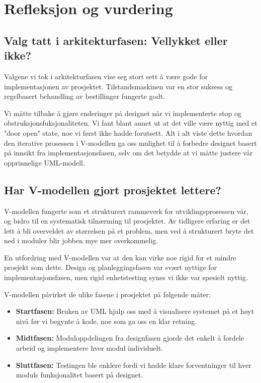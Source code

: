 \chapter{Refleksjon og vurdering}
\section{Valg tatt i arkitekturfasen: Vellykket eller ikke?}
Valgene vi tok i arkitekturfasen vise seg stort sett å være gode for implementasjonen av prosjektet. Tilstandsmaskinen var en stor suksess og regelbasert behandling av bestillinger fungerte godt. 

Vi måtte tilbake å gjøre enderinger på designet når vi implementerte stop og obstruksjonsfuksjonaliteten. Vi fant blant annet ut at det ville være nyttig med et "door open" state, noe vi først ikke hadde forutsett. Alt i alt viste dette hvordan den iterative prosessen i V-modellen ga oss mulighet til å forbedre designet basert på innsikt fra implementasjonsfasen, selv om det betydde at vi måtte justere vår opprinnelige UML-modell.

\section{Har V-modellen gjort prosjektet lettere?}
V-modellen fungerte som et strukturert rammeverk for utviklingsprosessen vår, og bidro til en systematisk tilnærming til prosjektet. Av tidligere erfaring er det lett å bli overveldet av størrelsen på et problem, men ved å strukturert bryte det ned i moduler blir jobben mye mer overkommelig. 

En utfordring med V-modellen var at den kan virke noe rigid for et mindre prosjekt som dette. Design og planleggingsfasen var svært nyttige for implementasjonsfasen, men rigid enhetstesting synes vi ikke var spesielt nyttig.

V-modellen påvirket de ulike fasene i prosjektet på følgende måter:
\begin{itemize}
    \item \textbf{Startfasen:} Bruken av UML hjalp oss med å visualisere systemet på et høyt nivå før vi begynte å kode, noe som ga oss en klar retning.
    \item \textbf{Midtfasen:} Moduloppdelingen fra designfasen gjorde det enkelt å fordele arbeid og implementere hver modul individuelt.
    \item \textbf{Sluttfasen:} Testingen ble enklere fordi vi hadde klare forventninger til hver moduls funksjonalitet basert på designet.
\end{itemize}

